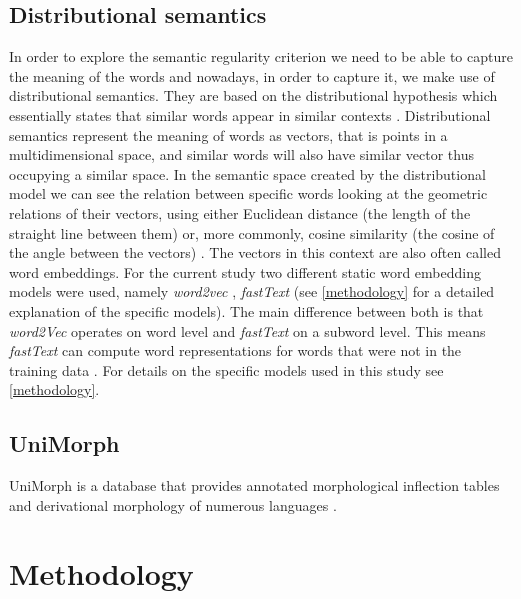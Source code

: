 \documentclass[12pt]{article}
\begin{document}
\subsection{Distributional semantics} \label{distributional-semantics}
In order to explore the semantic regularity criterion we need to be able to capture the meaning of the words and nowadays, in order to capture it, we make use of distributional semantics. They are based on the distributional hypothesis which essentially states that similar words appear in similar contexts \parencite{boleda2020DistributionalSemanticsLinguistic}. Distributional semantics represent the meaning of words as vectors, that is points in a multidimensional space, and similar words will also have similar vector thus occupying a similar space. In the semantic space created by the distributional model we can see the relation between specific words looking at the geometric relations of their vectors, using either Euclidean distance (the length of the straight line between them) or, more commonly, cosine similarity (the cosine of the angle between the vectors) \parencite{boleda2020DistributionalSemanticsLinguistic,chandrasekaran2021EvolutionSemanticSimilarity}. The vectors in this context are also often called word embeddings. For the current study two different static word embedding models were used, namely \textit{word2vec} \parencite{mikolov2013EfficientEstimationWord}, \textit{fastText} \parencite{bojanowski2017EnrichingWordVectors} (see \autoref{methodology} for a detailed explanation of the specific models). The main difference between both is that \textit{word2Vec} operates on word level and \textit{fastText} on a subword level. This means \textit{fastText} can compute word representations for words that were not in the training data \parencite{bojanowski2017EnrichingWordVectors}. %
For details on the specific models used in this study see \autoref{methodology}.

\subsection{UniMorph}

UniMorph is a database that provides annotated morphological inflection tables and derivational morphology of numerous languages \parencite{batsuren2022UniMorph40Universal}.

\section{Methodology} \label{methodology}
\end{document}
